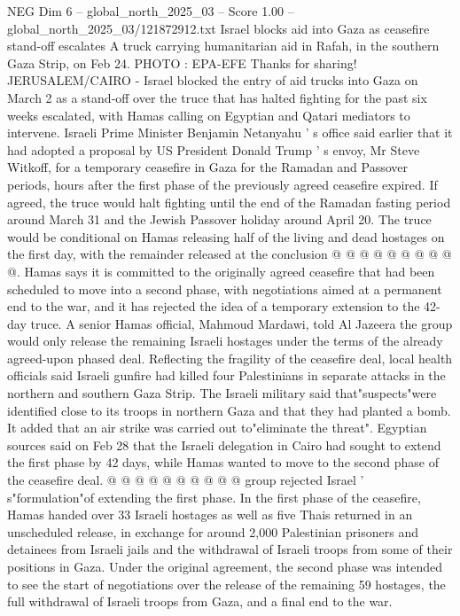 \begin{textsample}{NEG Dim 6 – global\_north\_2025\_03 – Score 1.00 – global\_north\_2025\_03/121872912.txt}  \label{ex:f6_neg_173}
Israel blocks aid into Gaza as ceasefire stand-off escalates A truck carrying humanitarian aid in Rafah, in the southern Gaza Strip, on Feb 24.
PHOTO : EPA-EFE Thanks for sharing!
JERUSALEM/CAIRO - Israel blocked the entry of aid trucks into Gaza on March 2 as a stand-off over the truce that has halted fighting for the past six weeks escalated, with Hamas calling on Egyptian and Qatari mediators to intervene.
Israeli Prime Minister Benjamin Netanyahu ' s office said earlier that it had adopted a proposal by US President Donald Trump ' s envoy, Mr Steve Witkoff, for a temporary ceasefire in Gaza for the Ramadan and Passover periods, hours after the first phase of the previously agreed ceasefire expired.
If agreed, the truce would halt fighting until the end of the Ramadan fasting period around March 31 and the Jewish Passover holiday around April 20.
The truce would be conditional on Hamas releasing half of the living and dead hostages on the first day, with the remainder released at the conclusion @ @ @ @ @ @ @ @ @ @.
Hamas says it is committed to the originally agreed ceasefire that had been scheduled to move into a second phase, with negotiations aimed at a permanent end to the war, and it has rejected the idea of a temporary extension to the 42-day truce.
A senior Hamas official, Mahmoud Mardawi, told Al Jazeera the group would only release the remaining Israeli hostages under the terms of the already agreed-upon phased deal.
Reflecting the fragility of the ceasefire deal, local health officials said Israeli gunfire had killed four Palestinians in separate attacks in the northern and southern Gaza Strip.
The Israeli military said that"suspects"were identified close to its troops in northern Gaza and that they had planted a bomb.
It added that an air strike was carried out to"eliminate the threat".
Egyptian sources said on Feb 28 that the Israeli delegation in Cairo had sought to extend the first phase by 42 days, while Hamas wanted to move to the second phase of the ceasefire deal. @ @ @ @ @ @ @ @ @ @ group rejected Israel ' s"formulation"of extending the first phase.
In the first phase of the ceasefire, Hamas handed over 33 Israeli hostages as well as five Thais returned in an unscheduled release, in exchange for around 2,000 Palestinian prisoners and detainees from Israeli jails and the withdrawal of Israeli troops from some of their positions in Gaza.
Under the original agreement, the second phase was intended to see the start of negotiations over the release of the remaining 59 hostages, the full withdrawal of Israeli troops from Gaza, and a final end to the war.

\end{textsample}
